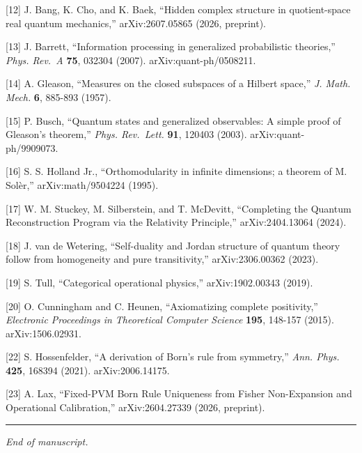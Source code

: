 \documentclass[
]{article}
\begin{document}
{[}12{]} J. Bang, K. Cho, and K. Baek, ``Hidden complex structure in
quotient-space real quantum mechanics,'' arXiv:2607.05865 (2026,
preprint).

{[}13{]} J. Barrett, ``Information processing in generalized
probabilistic theories,'' \emph{Phys. Rev.~A} \textbf{75}, 032304
(2007). arXiv:quant-ph/0508211.

{[}14{]} A. Gleason, ``Measures on the closed subspaces of a Hilbert
space,'' \emph{J. Math. Mech.} \textbf{6}, 885-893 (1957).

{[}15{]} P. Busch, ``Quantum states and generalized observables: A
simple proof of Gleason's theorem,'' \emph{Phys. Rev.~Lett.}
\textbf{91}, 120403 (2003). arXiv:quant-ph/9909073.

{[}16{]} S. S. Holland Jr., ``Orthomodularity in infinite dimensions; a
theorem of M. Solèr,'' arXiv:math/9504224 (1995).

{[}17{]} W. M. Stuckey, M. Silberstein, and T. McDevitt, ``Completing
the Quantum Reconstruction Program via the Relativity Principle,''
arXiv:2404.13064 (2024).

{[}18{]} J. van de Wetering, ``Self-duality and Jordan structure of
quantum theory follow from homogeneity and pure transitivity,''
arXiv:2306.00362 (2023).

{[}19{]} S. Tull, ``Categorical operational physics,'' arXiv:1902.00343
(2019).

{[}20{]} O. Cunningham and C. Heunen, ``Axiomatizing complete
positivity,'' \emph{Electronic Proceedings in Theoretical Computer
Science} \textbf{195}, 148-157 (2015). arXiv:1506.02931.

{[}22{]} S. Hossenfelder, ``A derivation of Born's rule from symmetry,''
\emph{Ann. Phys.} \textbf{425}, 168394 (2021). arXiv:2006.14175.

{[}23{]} A. Lax, ``Fixed-PVM Born Rule Uniqueness from Fisher
Non-Expansion and Operational Calibration,'' arXiv:2604.27339 (2026,
preprint).

\begin{center}\rule{0.5\linewidth}{0.5pt}\end{center}

\emph{End of manuscript.}
\end{document}
